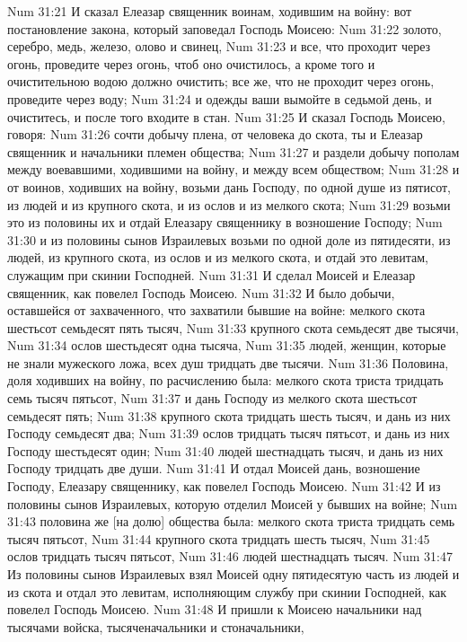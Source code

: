 Num 31:21  И сказал Елеазар священник воинам, ходившим на войну: вот постановление закона, который заповедал Господь Моисею:
Num 31:22  золото, серебро, медь, железо, олово и свинец,
Num 31:23  и все, что проходит через огонь, проведите через огонь, чтоб оно очистилось, а кроме того и очистительною водою должно очистить; все же, что не проходит через огонь, проведите через воду;
Num 31:24  и одежды ваши вымойте в седьмой день, и очиститесь, и после того входите в стан.
Num 31:25  И сказал Господь Моисею, говоря:
Num 31:26  сочти добычу плена, от человека до скота, ты и Елеазар священник и начальники племен общества;
Num 31:27  и раздели добычу пополам между воевавшими, ходившими на войну, и между всем обществом;
Num 31:28  и от воинов, ходивших на войну, возьми дань Господу, по одной душе из пятисот, из людей и из крупного скота, и из ослов и из мелкого скота;
Num 31:29  возьми это из половины их и отдай Елеазару священнику в возношение Господу;
Num 31:30  и из половины сынов Израилевых возьми по одной доле из пятидесяти, из людей, из крупного скота, из ослов и из мелкого скота, и отдай это левитам, служащим при скинии Господней.
Num 31:31  И сделал Моисей и Елеазар священник, как повелел Господь Моисею.
Num 31:32  И было добычи, оставшейся от захваченного, что захватили бывшие на войне: мелкого скота шестьсот семьдесят пять тысяч,
Num 31:33  крупного скота семьдесят две тысячи,
Num 31:34  ослов шестьдесят одна тысяча,
Num 31:35  людей, женщин, которые не знали мужеского ложа, всех душ тридцать две тысячи.
Num 31:36  Половина, доля ходивших на войну, по расчислению была: мелкого скота триста тридцать семь тысяч пятьсот,
Num 31:37  и дань Господу из мелкого скота шестьсот семьдесят пять;
Num 31:38  крупного скота тридцать шесть тысяч, и дань из них Господу семьдесят два;
Num 31:39  ослов тридцать тысяч пятьсот, и дань из них Господу шестьдесят один;
Num 31:40  людей шестнадцать тысяч, и дань из них Господу тридцать две души.
Num 31:41  И отдал Моисей дань, возношение Господу, Елеазару священнику, как повелел Господь Моисею.
Num 31:42  И из половины сынов Израилевых, которую отделил Моисей у бывших на войне;
Num 31:43  половина же [на долю] общества была: мелкого скота триста тридцать семь тысяч пятьсот,
Num 31:44  крупного скота тридцать шесть тысяч,
Num 31:45  ослов тридцать тысяч пятьсот,
Num 31:46  людей шестнадцать тысяч.
Num 31:47  Из половины сынов Израилевых взял Моисей одну пятидесятую часть из людей и из скота и отдал это левитам, исполняющим службу при скинии Господней, как повелел Господь Моисею.
Num 31:48  И пришли к Моисею начальники над тысячами войска, тысяченачальники и стоначальники,
